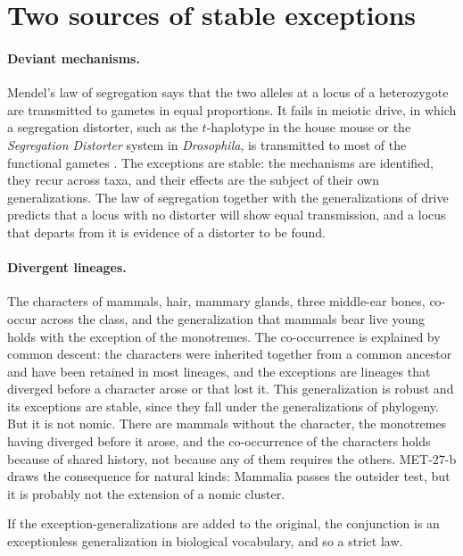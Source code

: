 \documentclass{situationist-preprint}
\begin{document}
\section{Two sources of stable exceptions}\label{s:sources}

\paragraph{Deviant mechanisms.} Mendel's law of segregation says that the two alleles at a locus of a heterozygote are transmitted to gametes in equal proportions. It fails in meiotic drive, in which a segregation distorter, such as the $t$-haplotype in the house mouse or the \emph{Segregation Distorter} system in \emph{Drosophila}, is transmitted to most of the functional gametes \citep{Lyttle1991}. The exceptions are stable: the mechanisms are identified, they recur across taxa, and their effects are the subject of their own generalizations. The law of segregation together with the generalizations of drive predicts that a locus with no distorter will show equal transmission, and a locus that departs from it is evidence of a distorter to be found.

\paragraph{Divergent lineages.} The characters of mammals, hair, mammary glands, three middle-ear bones, co-occur across the class, and the generalization that mammals bear live young holds with the exception of the monotremes. The co-occurrence is explained by common descent: the characters were inherited together from a common ancestor and have been retained in most lineages, and the exceptions are lineages that diverged before a character arose or that lost it. This generalization is robust and its exceptions are stable, since they fall under the generalizations of phylogeny. But it is not nomic. There are mammals without the character, the monotremes having diverged before it arose, and the co-occurrence of the characters holds because of shared history, not because any of them requires the others. MET-27-b draws the consequence for natural kinds: Mammalia passes the outsider test, but it is probably not the extension of a nomic cluster.

\begin{objection}
If the exception-generalizations are added to the original, the conjunction is an exceptionless generalization in biological vocabulary, and so a strict law.
\end{objection}
\end{document}
